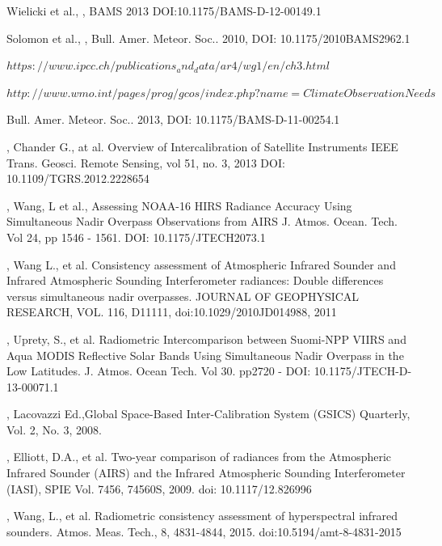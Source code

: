 \documentclass[11pt]{article}
\begin{document}
\begin{thebibliography}{9}

  Wielicki et al.,
  \emph{},
  BAMS 2013
  DOI:10.1175/BAMS-D-12-00149.1

  Solomon et al.,
  \emph{},
  Bull. Amer. Meteor. Soc.. 2010, 
  DOI: 10.1175/2010BAMS2962.1

 $ https://www.ipcc.ch/publications_and_data/ar4/wg1/en/ch3.html $

 $ http://www.wmo.int/pages/prog/gcos/index.php?name=ClimateObservationNeeds $

  Bull. Amer. Meteor. Soc.. 2013, 
  DOI: 10.1175/BAMS-D-11-00254.1

  \emph{},
  Chander G., at al.
  Overview of Intercalibration of Satellite Instruments
  IEEE Trans. Geosci. Remote Sensing, vol 51, no. 3, 2013
  DOI: 10.1109/TGRS.2012.2228654
  
  \emph{},
  Wang, L et al., 
  Assessing NOAA-16 HIRS Radiance Accuracy Using Simultaneous Nadir Overpass Observations from AIRS
  J. Atmos. Ocean. Tech. Vol 24, pp 1546 - 1561.
  DOI: 10.1175/JTECH2073.1

  \emph{},
  Wang L., et al. 
  Consistency assessment of Atmospheric Infrared Sounder and Infrared Atmospheric Sounding Interferometer radiances: Double differences versus simultaneous nadir overpasses.
 JOURNAL OF GEOPHYSICAL RESEARCH, VOL. 116, D11111,
 doi:10.1029/2010JD014988, 2011

  \emph{},
  Uprety, S., et al. 
  Radiometric Intercomparison between Suomi-NPP VIIRS and Aqua MODIS Reflective Solar Bands Using   Simultaneous Nadir Overpass in the Low Latitudes.
  J. Atmos. Ocean Tech. Vol 30. pp2720 - 
  DOI: 10.1175/JTECH-D-13-00071.1

  \emph{},
  Lacovazzi Ed.,Global Space-Based Inter-Calibration System (GSICS) Quarterly,
  Vol. 2, No. 3, 2008.

  \emph{},
  Elliott, D.A., et al.
  Two-year comparison of radiances from the Atmospheric Infrared Sounder (AIRS) and the Infrared Atmospheric Sounding Interferometer (IASI),
  SPIE Vol. 7456, 74560S, 2009.
  doi: 10.1117/12.826996

  \emph{},
  Wang, L., et al. Radiometric consistency assessment of hyperspectral infrared sounders.
  Atmos. Meas. Tech., 8, 4831-4844, 2015.
  doi:10.5194/amt-8-4831-2015


\end{thebibliography}
\end{document}

